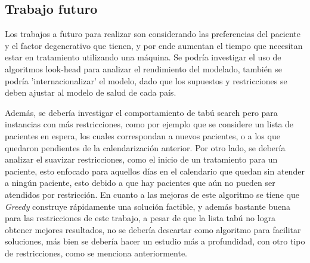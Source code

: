 \documentclass[letter, 10pt]{article}
\begin{document}
\subsection{Trabajo futuro}

Los trabajos a futuro para realizar son considerando las preferencias del paciente y el factor degenerativo que tienen, y por ende aumentan el tiempo que necesitan estar en tratamiento utilizando una máquina. Se podría investigar el uso de algoritmos look-head para analizar el rendimiento del modelado\cite{trece}, también se podría 'internacionalizar' el modelo, dado que los supuestos y restricciones se deben ajustar al modelo de salud de cada país.

Además, se debería investigar el comportamiento de tabú search pero para instancias con más restricciones, como por ejemplo que se considere un lista de pacientes en espera, los cuales correspondan a nuevos pacientes, o a los que quedaron pendientes de la calendarización anterior. Por otro lado, se debería analizar el suavizar restricciones, como el inicio de un tratamiento para un paciente, esto enfocado para aquellos días en el calendario que quedan sin atender a ningún paciente, esto debido a que hay pacientes que aún no pueden ser atendidos por restricción. En cuanto a las mejoras de este algoritmo se tiene que \textit{Greedy} construye rápidamente una solución factible, y además bastante buena para las restricciones de este trabajo, a pesar de que la lista tabú no logra obtener mejores resultados, no se debería descartar como algoritmo para facilitar soluciones, más bien se debería hacer un estudio más a profundidad, con otro tipo de restricciones, como se menciona anteriormente. 





\end{document}
